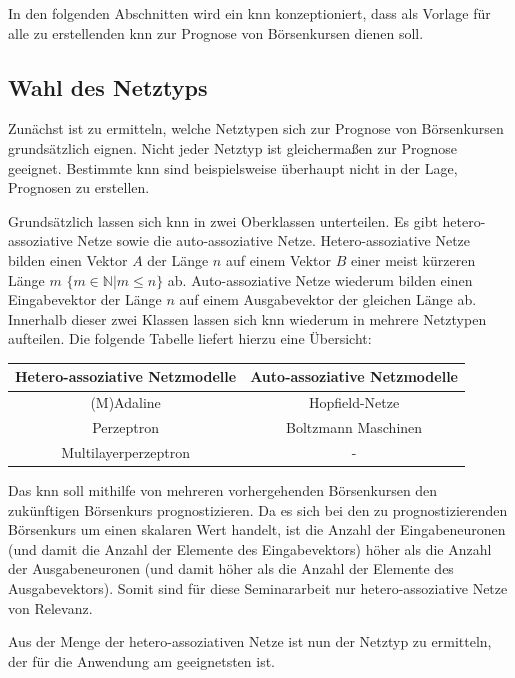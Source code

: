 In den folgenden Abschnitten wird ein \acs{knn} konzeptioniert, dass als Vorlage für alle zu erstellenden \acs{knn} zur Prognose von Börsenkursen dienen soll. 

\subsection{Wahl des Netztyps}
\label{subsection:Wahl des Netztyps}
Zunächst ist zu ermitteln, welche Netztypen sich zur Prognose von Börsenkursen grundsätzlich eignen. Nicht jeder Netztyp ist gleichermaßen zur Prognose geeignet. Bestimmte \acs{knn} sind beispielsweise überhaupt nicht in der Lage, Prognosen zu erstellen. 

Grundsätzlich lassen sich \acs{knn} in zwei Oberklassen unterteilen. Es gibt hetero-assoziative Netze sowie die auto-assoziative Netze. Hetero-assoziative Netze bilden einen Vektor $A$ der Länge $n$ auf einem Vektor $B$ einer meist kürzeren Länge $m$ $\{m \in \mathbb{N} | m \le n\}$ ab. Auto-assoziative Netze wiederum bilden einen Eingabevektor der Länge $n$ auf einem Ausgabevektor der gleichen Länge ab. Innerhalb dieser zwei Klassen lassen sich \acs{knn} wiederum in mehrere Netztypen aufteilen. Die folgende Tabelle liefert hierzu eine Übersicht:

\begin{center}
\begin{tabular}{|c|c|}
\hline 
\textbf{Hetero-assoziative Netzmodelle} & \textbf{Auto-assoziative Netzmodelle} \\ 
\hline 
(M)Adaline & Hopfield-Netze \\ 
\hline  
Perzeptron &  Boltzmann Maschinen \\ 
\hline 
Multilayerperzeptron & - \\ 
\hline 
\end{tabular} 
\end{center}

Das \acs{knn} soll mithilfe von mehreren vorhergehenden Börsenkursen den zukünftigen Börsenkurs prognostizieren. Da es sich bei den zu prognostizierenden Börsenkurs um einen skalaren Wert handelt, ist die Anzahl der Eingabeneuronen (und damit die Anzahl der Elemente des Eingabevektors) höher als die Anzahl der Ausgabeneuronen (und damit höher als die Anzahl der Elemente des Ausgabevektors). Somit sind für diese Seminararbeit nur hetero-assoziative Netze von Relevanz.

Aus der Menge der hetero-assoziativen Netze ist nun der Netztyp zu ermitteln, der für die Anwendung am geeignetsten ist.

